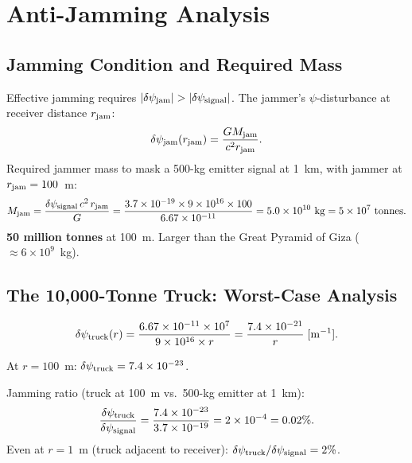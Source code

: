 \documentclass[aps,prd,twocolumn,superscriptaddress,nofootinbib]{revtex4-2}
\begin{document}
\section{Anti-Jamming Analysis}
\label{sec:jamming}

\subsection{Jamming Condition and Required Mass}

Effective jamming requires $|\delta\psi_{\rm jam}| > |\delta\psi_{\rm signal}|$.
The jammer's $\psi$-disturbance at receiver distance $r_{\rm jam}$:
\begin{equation}
\delta\psi_{\rm jam}(r_{\rm jam}) = \frac{GM_{\rm jam}}{c^2 r_{\rm jam}}.
\label{eq:psi-jam}
\end{equation}
Required jammer mass to mask a 500-kg emitter signal at 1~km,
with jammer at $r_{\rm jam} = 100$~m:
\begin{equation}
M_{\rm jam} = \frac{\delta\psi_{\rm signal}\,c^2\,r_{\rm jam}}{G}
= \frac{3.7\times10^{-19}\times9\times10^{16}\times100}
{6.67\times10^{-11}}
= 5.0\times10^{10}~\mathrm{kg} = 5\times10^7~\mathrm{tonnes}.
\label{eq:jam-mass}
\end{equation}
\textbf{50 million tonnes} at 100~m.  Larger than the Great Pyramid
of Giza ($\approx 6\times10^9$~kg).

\subsection{The 10,000-Tonne Truck: Worst-Case Analysis}

\begin{equation}
\delta\psi_{\rm truck}(r) = \frac{6.67\times10^{-11}\times10^7}
{9\times10^{16}\times r}
= \frac{7.4\times10^{-21}}{r}\;\mathrm{[m^{-1}]}.
\label{eq:psi-truck}
\end{equation}

At $r = 100$~m: $\delta\psi_{\rm truck} = 7.4\times10^{-23}$.

Jamming ratio (truck at 100~m vs.\ 500-kg emitter at 1~km):
\begin{equation}
\frac{\delta\psi_{\rm truck}}{\delta\psi_{\rm signal}}
= \frac{7.4\times10^{-23}}{3.7\times10^{-19}} = 2\times10^{-4} = 0.02\%.
\label{eq:jam-ratio}
\end{equation}
Even at $r = 1$~m (truck adjacent to receiver):
$\delta\psi_{\rm truck}/\delta\psi_{\rm signal} = 2\%$.
\end{document}
